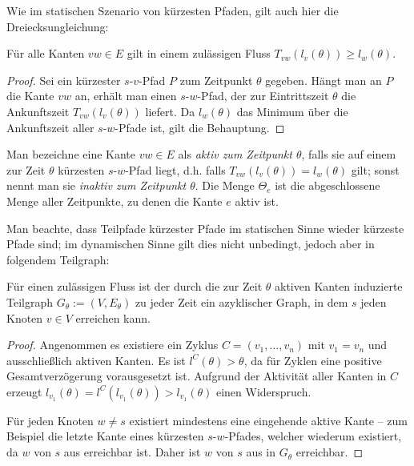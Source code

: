 Wie im statischen Szenario von kürzesten Pfaden, gilt auch hier die Dreiecksungleichung: 

\begin{lemma}\label{lemma-dreicksungl}
	Für alle Kanten $vw\in E$ gilt in einem zulässigen Fluss 
	$T_{vw}(l_v(\theta)) \geq l_w(\theta)$.
\end{lemma}
\begin{proof}
	Sei ein kürzester $s$-$v$-Pfad $P$ zum Zeitpunkt $\theta$ gegeben.
	Hängt man an $P$ die Kante $vw$ an, erhält man einen $s$-$w$-Pfad, der zur Eintrittszeit $\theta$ die Ankunftszeit $T_{vw}(l_v(\theta))$ liefert.
	Da $l_w(\theta)$ das Minimum über die Ankunftszeit aller $s$-$w$-Pfade ist, gilt die Behauptung.
\end{proof}

\begin{definition}
	Man bezeichne eine Kante $vw\in E$ als \emph{aktiv zum Zeitpunkt $\theta$}, falls sie auf einem zur Zeit $\theta$ kürzesten $s$-$w$-Pfad liegt, d.h. falls $T_{vw}(l_v(\theta)) = l_w(\theta)$ gilt; sonst nennt man sie \emph{inaktiv zum Zeitpunkt $\theta$}.
	Die Menge $\Theta_e$ ist die abgeschlossene Menge aller Zeitpunkte, zu denen die Kante $e$ aktiv ist.
\end{definition}

Man beachte, dass Teilpfade kürzester Pfade im statischen Sinne wieder kürzeste Pfade sind; im dynamischen Sinne gilt dies nicht unbedingt, jedoch aber in folgendem Teilgraph:

\begin{lemma}\label{lemma-shortest-path-using-active-edges}
	Für einen zulässigen Fluss ist der durch die zur Zeit $\theta$ aktiven Kanten induzierte Teilgraph $G_\theta:=(V, E_\theta)$ zu jeder Zeit ein azyklischer Graph, in dem $s$ jeden Knoten $v\in V$ erreichen kann.
\end{lemma}
\begin{proof}
	Angenommen es existiere ein Zyklus $C=(v_1, \dots, v_n)$ mit $v_1=v_n$ und ausschließlich aktiven Kanten.
	Es ist $l^C(\theta) > \theta$, da für Zyklen eine positive Gesamtverzögerung vorausgesetzt ist.
	Aufgrund der Aktivität aller Kanten in $C$ erzeugt $l_{v_1}(\theta) = l^C(l_{v_1}(\theta)) > l_{v_1}(\theta)$ einen Widerspruch.
	
	Für jeden Knoten $w\neq s$ existiert mindestens eine eingehende aktive Kante -- zum Beispiel die letzte Kante eines kürzesten $s$-$w$-Pfades, welcher wiederum existiert, da $w$ von $s$ aus erreichbar ist.
	Daher ist $w$ von $s$ aus in $G_\theta$ erreichbar.
\end{proof}

